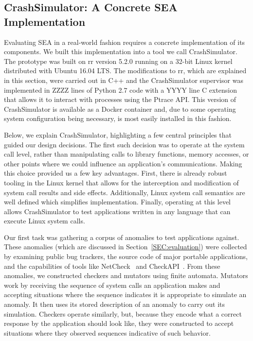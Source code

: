 \subsection{CrashSimulator: A Concrete SEA Implementation}
\label{SUBSEC:ApproachCrashSim}
Evaluating SEA in a real-world fashion requires a
concrete implementation of its components.
We built this implementation into a tool we call CrashSimulator.  The
prototype was built on rr version 5.2.0 running on a 32-bit Linux kernel
distributed with Ubuntu 16.04 LTS.  The modifications to rr, which are
explained in this section, were carried out in C++ and the CrashSimulator
supervisor was implemented in ZZZZ lines of Python 2.7 code with a YYYY
line C extension that allows it to interact with processes using the Ptrace
API.
This version of CrashSimulator is available as a Docker container and,
due to some operating system configuration being necessary, is most easily
installed in this fashion.

Below, we explain CrashSimulator, highlighting a
few central principles that guided our design decisions. The first such
decision was to operate at the system call level, rather than manipulating
calls to library functions, memory accesses, or other points where we could
influence an application's communications. Making this choice provided us a
few key advantages. First, there is already robust tooling in the Linux
kernel that allows for the interception and modification of system call
results and side effects. Additionally, Linux system call semantics are
well defined which simplifies implementation. Finally, operating at this
level allows CrashSimulator to test applications written in any language
that can execute Linux system calls.

Our first task was
gathering a corpus of anomalies to test applications
against.  These anomalies (which are discussed
in Section~\ref{SEC:evaluation})
were collected by examining public bug trackers,
the source code of major portable applications, and the capabilities of
tools like NetCheck~\cite{Zhuang_NSDI_2014}
and CheckAPI~\cite{rasley2015detecting}.
From these anomalies,
we constructed
checkers and mutators
using finite automata.
Mutators work by receiving the sequence of system calls
an application makes and accepting situations where the sequence indicates
it is appropriate to simulate an anomaly.
It then uses its stored
description of an anomaly
to carry out its simulation.
Checkers operate similarly,
but, because they encode what a
correct response by the application should look like,
they were constructed
to accept situations where they observed sequences indicative of such
behavior.

